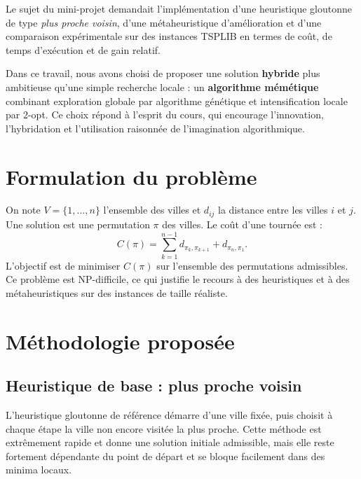 \documentclass[11pt,a4paper]{article}
\begin{document}
Le sujet du mini-projet demandait l'implémentation d'une heuristique gloutonne de type \emph{plus proche voisin}, d'une métaheuristique d'amélioration et d'une comparaison expérimentale sur des instances TSPLIB en termes de coût, de temps d'exécution et de gain relatif.

Dans ce travail, nous avons choisi de proposer une solution \textbf{hybride} plus ambitieuse qu'une simple recherche locale : un \textbf{algorithme mémétique} combinant exploration globale par algorithme génétique et intensification locale par 2-opt. Ce choix répond à l'esprit du cours, qui encourage l'innovation, l'hybridation et l'utilisation raisonnée de l'imagination algorithmique.

\section{Formulation du problème}
On note $V=\{1,\dots,n\}$ l'ensemble des villes et $d_{ij}$ la distance entre les villes $i$ et $j$. Une solution est une permutation $\pi$ des villes. Le coût d'une tournée est :
\[
C(\pi)=\sum_{k=1}^{n-1} d_{\pi_k,\pi_{k+1}} + d_{\pi_n,\pi_1}.
\]
L'objectif est de minimiser $C(\pi)$ sur l'ensemble des permutations admissibles. Ce problème est NP-difficile, ce qui justifie le recours à des heuristiques et à des métaheuristiques sur des instances de taille réaliste.

\section{Méthodologie proposée}

\subsection{Heuristique de base : plus proche voisin}
L'heuristique gloutonne de référence démarre d'une ville fixée, puis choisit à chaque étape la ville non encore visitée la plus proche. Cette méthode est extrêmement rapide et donne une solution initiale admissible, mais elle reste fortement dépendante du point de départ et se bloque facilement dans des minima locaux.
\end{document}

